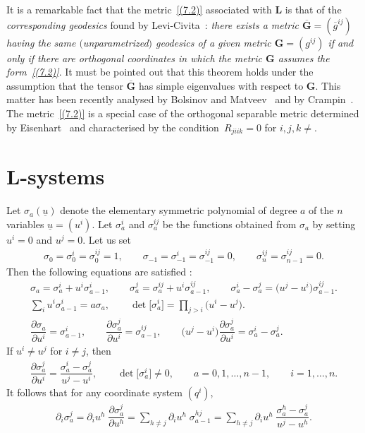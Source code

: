 \documentclass[10pt,a4paper]{amsart}
\def\bs{\boldsymbol}
\numberwithin{equation}{section}
\begin{document}
It is a remarkable fact that the metric~\eqref{(7.2)} associated with $\bs L$ is that of the {\it correspon\-ding geodesics} found by Levi-Civita~\cite{LC-1896}: {\it there exists a metric $\overline{\bs G}=(\overline g^{ij})$ having the same $($unparametrized$)$ geodesics of a given metric $\bs G=(g^{ij})$ if and only if there are orthogonal coordinates in which the metric $\bs G$ assumes the form~\eqref{(7.2)}}. It must be pointed out that this theorem holds under the assumption that the tensor $\overline {\bs G}$ has simple eigenvalues with respect to  $\bs G$. This matter has been recently analysed by Bolsinov and Matveev~\cite{Bolsinov-Matveev-2003} and by Crampin~\cite{Crampin-2003b}. The metric~\eqref{(7.2)} is a special case of the orthogonal separable metric determined by Eisenhart~\cite[Appendix~13]{Eisenhart-1949}
and characterised by the condition~$R_{jiik}=0$ for $i,j,k\neq$.

\section{L-systems}\label{section8}

Let $\sigma_a(\underline u)$ denote the elementary symmetric polynomial of degree $a$ of the $n$ variables $\underline u=(u^i)$. Let $\sigma_a^i$ and $\sigma_a^{ij}$ be the functions obtained from $\sigma_a$ by setting $u^i=0$ and $u^j=0$. Let us set
\begin{gather}
\sigma_0=\sigma_0^i=\sigma_0^{ij}=1, \qquad \sigma_{-1}=\sigma_{-1}^i=\sigma_{-1}^{ij}=0,\qquad\sigma^{ij}_n=\sigma_{n-1}^{ij}=0.
\label{(8.1)}
\end{gather}
Then the following equations are satisf\/ied \cite[Section~2]{Benenti-1992b}:
\begin{gather}
\sigma_a=\sigma_a^i+u^i \sigma_{a-1}^i, \qquad \sigma_a^j=\sigma_a^{ij}+u^i \sigma_{a-1}^{ij}, \qquad \sigma_a^i-\sigma_a^j=\big(u^j-u^i\big) \sigma^{ij}_{a-1}.
\label{(8.2)}
\\
 \sum_i u^i \sigma_{a-1}^i=a \sigma_a, \qquad
\det \big[\sigma_a^i\big]= \prod_{j>i}\big(u^i-u^j\big).
\label{(8.3)}
\\
\dfrac{\partial \sigma_a}{\partial u^i}=\sigma^i_{a-1},\qquad
\dfrac{\partial \sigma_a^j}{\partial u^i}=\sigma_{a-1}^{ij},\qquad
\big(u^j-u^i\big)\dfrac{\partial \sigma_a^j}{\partial u^i}=\sigma_a^i-\sigma_a^j.
\label{(8.4)}
\end{gather}
If $u^i\neq u^j$ for $i\neq j$, then
\begin{gather*}
\dfrac{\partial \sigma_a^j}{\partial u^i}=\dfrac{\sigma_a^i-\sigma_a^j}{u^j-u^i},
\qquad
\det \big[\sigma_a^i\big]\neq 0, \qquad a=0,1,\ldots, n-1,\qquad i=1,\ldots,n.
\end{gather*}
It follows that for any coordinate system $(q^i)$,
\begin{gather}
\partial_i\sigma_a^j=\partial_iu^h\;\dfrac{\partial\sigma_a^j}{\partial u^h}=\sum_{h\neq j}\partial_iu^h\;\sigma_{a-1}^{hj}=
\sum_{h\neq j}\partial_iu^h\;\dfrac{\sigma_a^h-\sigma_a^j}{u^j-u^h}.
\label{(8.6)}
 \end{gather}
\end{document}

